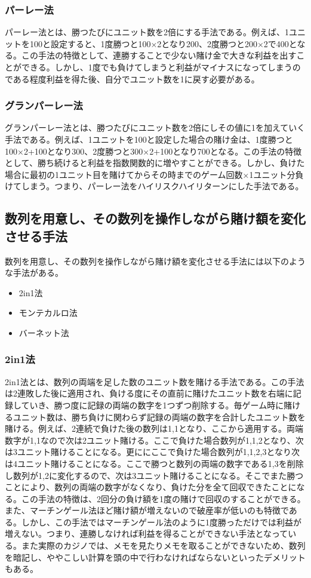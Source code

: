 \subsubsection{パーレー法}
パーレー法とは、勝つたびにユニット数を2倍にする手法である。例えば、1ユニットを100と設定すると、1度勝つと100×2となり200、2度勝つと200×2で400となる。この手法の特徴として、連勝することで少ない賭け金で大きな利益を出すことができる。しかし、1度でも負けてしまうと利益がマイナスになってしまうのである程度利益を得た後、自分でユニット数を1に戻す必要がある。
\subsubsection{グランパーレー法}
グランパーレー法とは、勝つたびにユニット数を2倍にしその値に1を加えていく手法である。例えば、1ユニットを100と設定した場合の賭け金は、1度勝つと100×2+100となり300、2度勝つと300×2+100となり700となる。この手法の特徴として、勝ち続けると利益を指数関数的に増やすことができる。しかし、負けた場合に最初の1ユニット目を賭けてからその時までのゲーム回数×1ユニット分負けてしまう。つまり、パーレー法をハイリスクハイリターンにした手法である。

\subsection{数列を用意し、その数列を操作しながら賭け額を変化させる手法}
 数列を用意し、その数列を操作しながら賭け額を変化させる手法には以下のような手法がある。
\begin{itemize}
 \item 2in1法
 \item モンテカルロ法
 \item バーネット法
\end{itemize}
\subsubsection{2in1法}
2in1法とは、数列の両端を足した数のユニット数を賭ける手法である。この手法は2連敗した後に適用され、負ける度にその直前に賭けたユニット数を右端に記録していき、勝つ度に記録の両端の数字を1つずつ削除する。毎ゲーム時に賭けるユニット数は、勝ち負けに関わらず記録の両端の数字を合計したユニット数を賭ける。例えば、2連続で負けた後の数列は1,1となり、ここから適用する。両端数字が1,1なので次は2ユニット賭ける。ここで負けた場合数列が1,1,2となり、次は3ユニット賭けることになる。更ににここで負けた場合数列が1,1,2,3となり次は4ユニット賭けることになる。ここで勝つと数列の両端の数字である1,3を削除し数列が1,2に変化するので、次は3ユニット賭けることになる。そこでまた勝つことにより、数列の両端の数字がなくなり、負けた分を全て回収できたことになる。この手法の特徴は、2回分の負け額を1度の賭けで回収のすることができる。また、マーチンゲール法ほど賭け額が増えないので破産率が低いのも特徴である。しかし、この手法ではマーチンゲール法のように1度勝っただけでは利益が増えない。つまり、連勝しなければ利益を得ることができない手法となっている。また実際のカジノでは、メモを見たりメモを取ることができないため、数列を暗記し、ややこしい計算を頭の中で行わなければならないといったデメリットもある。
